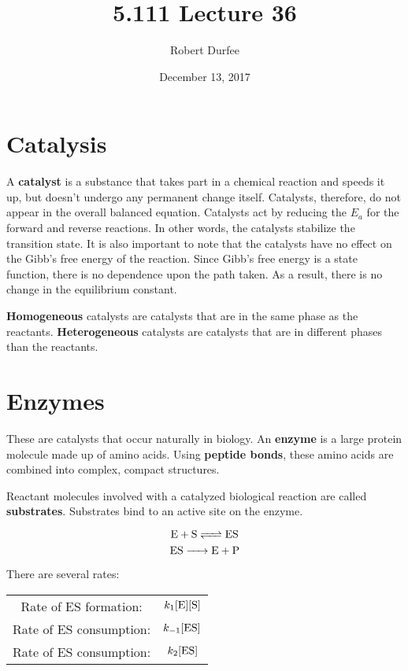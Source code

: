 \documentclass{article}
\title{ 5.111 Lecture 36 }
\author{ Robert Durfee }
\date{ December 13, 2017 }
\begin{document}
\maketitle

\section{ Catalysis }

A \textbf{catalyst} is a substance that takes part in a chemical reaction and
speeds it up, but doesn't undergo any permanent change itself. Catalysts,
therefore, do not appear in the overall balanced equation. Catalysts act by
reducing the $E_{a}$ for the forward and reverse reactions. In other words, the
catalysts stabilize the transition state. It is also important to note that the
catalysts have no effect on the Gibb's free energy of the reaction. Since Gibb's
free energy is a state function, there is no dependence upon the path taken. As
a result, there is no change in the equilibrium constant.

\textbf{Homogeneous} catalysts are catalysts that are in the same phase as the
reactants. \textbf{Heterogeneous} catalysts are catalysts that are in different
phases than the reactants.

\section{Enzymes}

These are catalysts that occur naturally in biology. An \textbf{enzyme} is a
large protein molecule made up of amino acids. Using \textbf{peptide bonds},
these amino acids are combined into complex, compact structures.

Reactant molecules involved with a catalyzed biological reaction are called
\textbf{substrates}. Substrates bind to an active site on the enzyme.

$$ \ce{ E + S <=> ES} $$
$$ \ce{ ES -> E + P } $$

There are several rates:
\begin{center}
  \begin{tabular}{ c c }
    Rate of ES formation: & $k_{1}[\ce{E}][\ce{S}]$\\
    Rate of ES consumption: & $k_{-1}[ \ce{ES}]$\\
    Rate of ES consumption: & $k_{2}[\ce{ES}]$\\
  \end{tabular}
\end{center}
\end{document}
